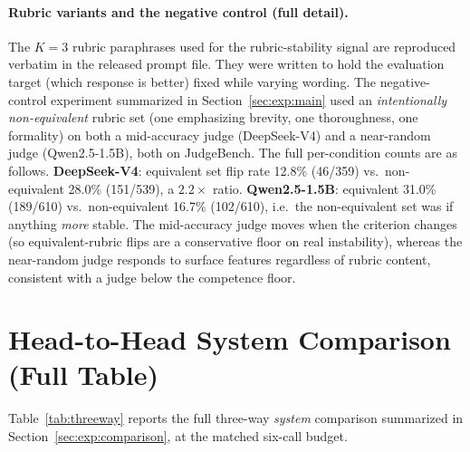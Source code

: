 \paragraph{Rubric variants and the negative control (full detail).}
The $K{=}3$ rubric paraphrases used for the rubric-stability signal are reproduced verbatim in the released prompt file. They were written to hold the evaluation target (which response is better) fixed while varying wording. The negative-control experiment summarized in Section~\ref{sec:exp:main} used an \emph{intentionally non-equivalent} rubric set (one emphasizing brevity, one thoroughness, one formality) on both a mid-accuracy judge (DeepSeek-V4) and a near-random judge (Qwen2.5-1.5B), both on JudgeBench. The full per-condition counts are as follows. \textbf{DeepSeek-V4}: equivalent set flip rate 12.8\% (46/359) vs.\ non-equivalent 28.0\% (151/539), a $2.2\times$ ratio. \textbf{Qwen2.5-1.5B}: equivalent 31.0\% (189/610) vs.\ non-equivalent 16.7\% (102/610), i.e.\ the non-equivalent set was if anything \emph{more} stable. The mid-accuracy judge moves when the criterion changes (so equivalent-rubric flips are a conservative floor on real instability), whereas the near-random judge responds to surface features regardless of rubric content, consistent with a judge below the competence floor.

\section{Head-to-Head System Comparison (Full Table)}
\label{app:threeway}
Table~\ref{tab:threeway} reports the full three-way \emph{system} comparison summarized in Section~\ref{sec:exp:comparison}, at the matched six-call budget.

